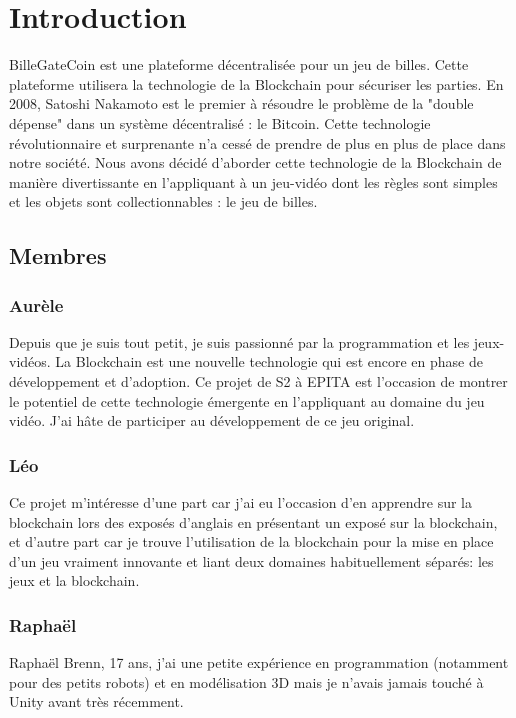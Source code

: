 \documentclass{article}
\begin{document}
\section{Introduction}
BilleGateCoin est une plateforme décentralisée pour un jeu de billes. Cette plateforme utilisera la technologie de la Blockchain pour sécuriser les parties. En 2008, Satoshi Nakamoto est le premier à résoudre le problème de la "double dépense" dans un système décentralisé : le Bitcoin. Cette technologie révolutionnaire et surprenante n'a cessé de prendre de plus en plus de place dans notre société. Nous avons décidé d'aborder cette technologie de la Blockchain de manière divertissante en l'appliquant à un jeu-vidéo dont les règles sont simples et les objets sont collectionnables : le jeu de billes.

\subsection{Membres}
\subsubsection{Aurèle}
Depuis que je suis tout petit, je suis passionné par la programmation et les jeux-vidéos. La Blockchain est une nouvelle technologie qui est encore en phase de développement et d'adoption. Ce projet de S2 à EPITA est l'occasion de montrer le potentiel de cette technologie émergente en l'appliquant au domaine du jeu vidéo. J'ai hâte de participer au développement de ce jeu original.

\subsubsection{Léo}
Ce projet m'intéresse d'une part car j'ai eu l'occasion d'en apprendre sur la blockchain lors des exposés d'anglais en présentant un exposé sur la blockchain, et d'autre part car je trouve l'utilisation de la blockchain pour la mise en place d'un jeu vraiment innovante et liant deux domaines habituellement séparés: les jeux et la blockchain.

\subsubsection{Raphaël}

Raphaël Brenn, 17 ans, j'ai une petite expérience en programmation (notamment pour des petits robots) et en modélisation 3D mais je n'avais jamais touché à Unity avant très récemment.
\end{document}
